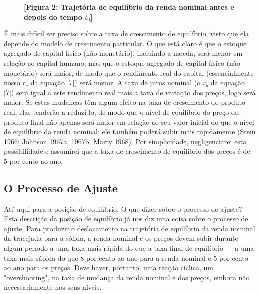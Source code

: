\documentclass[12pt]{article}
\begin{document}
\begin{figure}[h]
\centering
\textbf{[Figura 2: Trajetória de equilíbrio da renda nominal antes e depois do tempo $t_0$]}
\end{figure}

É mais difícil ser preciso sobre a taxa de crescimento de equilíbrio, visto que ela depende do modelo de crescimento particular. O que está claro é que o estoque agregado de capital físico (não monetário), incluindo a moeda, será menor em relação ao capital humano, mas que o estoque agregado de capital físico (não monetário) será maior, de modo que o rendimento real do capital (essencialmente nosso $r_e$ da equação [7]) será menor. A taxa de juros nominal (o $r_b$ da equação [7]) será igual a este rendimento real mais a taxa de variação dos preços, logo será maior. Se estas mudanças têm algum efeito na taxa de crescimento do produto real, elas tenderão a reduzi-lo, de modo que o nível de equilíbrio do preço do produto final não apenas será maior em relação ao seu valor inicial do que o nível de equilíbrio da renda nominal; ele também poderá subir mais rapidamente (Stein 1966; Johnson 1967a, 1967b; Marty 1968). Por simplicidade, negligenciarei esta possibilidade e assumirei que a taxa de crescimento de equilíbrio dos preços é de 5 por cento ao ano.

\subsection{O Processo de Ajuste}

Até aqui para a posição de equilíbrio. O que dizer sobre o processo de ajuste?
Esta descrição da posição de equilíbrio já nos diz uma coisa sobre o processo de ajuste. Para produzir o deslocamento na trajetória de equilíbrio da renda nominal da tracejada para a sólida, a renda nominal e os preços devem subir durante algum período a uma taxa mais rápida do que a taxa final de equilíbrio — a uma taxa mais rápida do que 8 por cento ao ano para a renda nominal e 5 por cento ao ano para os preços. Deve haver, portanto, uma reação cíclica, um "overshooting", na taxa de mudança da renda nominal e dos preços, embora não necessariamente nos seus níveis.
\end{document}
